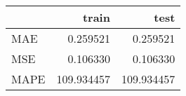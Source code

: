 \begin{tabular}{lrr}
\toprule
{} &       train &        test \\
\midrule
MAE  &    0.259521 &    0.259521 \\
MSE  &    0.106330 &    0.106330 \\
MAPE &  109.934457 &  109.934457 \\
\bottomrule
\end{tabular}
